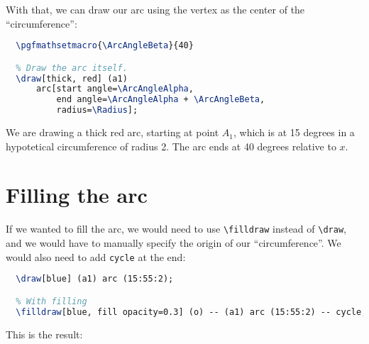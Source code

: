 \documentclass{amsart}
\begin{document}
With that, we can draw our arc using the vertex as the center of the
``circumference'':

\begin{lstlisting}[language=tex]
  % Angle in degrees where the arc Beta ends. Relative to `x'.
  \pgfmathsetmacro{\ArcAngleBeta}{40}

  % Draw the arc itself.
  \draw[thick, red] (a1)
      arc[start angle=\ArcAngleAlpha,
          end angle=\ArcAngleAlpha + \ArcAngleBeta,
          radius=\Radius];
\end{lstlisting}

We are drawing a thick red arc, starting at point $A_1$, which is at 15 degrees
in a hypotetical circumference of radius 2. The arc ends at 40 degrees relative
to $x$.

\newpage

\section{Filling the arc}

If we wanted to fill the arc, we would need to use \verb|\filldraw| instead of
\verb|\draw|, and we would have to manually specify the origin of our
``circumference''. We would also need to add \verb|cycle| at the end:


\begin{lstlisting}[language=tex]
  % Without filling
  \draw[blue] (a1) arc (15:55:2);

  % With filling
  \filldraw[blue, fill opacity=0.3] (o) -- (a1) arc (15:55:2) -- cycle;
\end{lstlisting}

This is the result:
\end{document}
